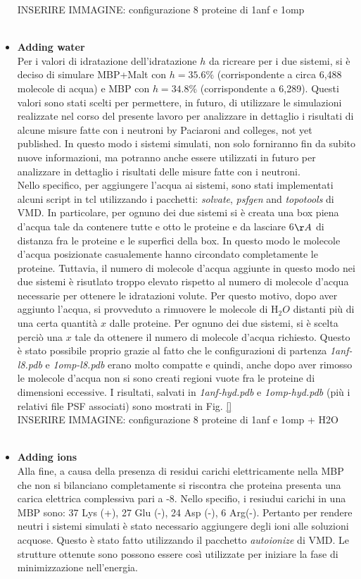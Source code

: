 \begin{itemize}
INSERIRE IMMAGINE: configurazione 8 proteine di 1anf e 1omp\\
\\
\item \textbf{Adding water}\\
Per i valori di idratazione dell'idratazione $h$ da ricreare per i due sistemi, si è deciso di simulare MBP+Malt con $h = 35.6\%$ (corrispondente a circa 6,488 molecole di acqua) e MBP con $h = 34.8\%$ (corrispondente a  6,289). Questi valori sono stati scelti per permettere, in futuro, di utilizzare le simulazioni realizzate nel corso del presente lavoro per analizzare in dettaglio i risultati di alcune misure fatte con i neutroni by Paciaroni and colleges, not yet published. In questo modo i sistemi simulati, non solo forniranno fin da subito nuove informazioni, ma potranno anche essere utilizzati in futuro per analizzare in dettaglio i risultati delle misure fatte con i neutroni.\\
Nello specifico, per aggiungere l'acqua ai sistemi, sono stati implementati alcuni script in tcl utilizzando i pacchetti: \textit{solvate}, \textit{psfgen} and \textit{topotools} di VMD. In particolare, per ognuno dei due sistemi si è creata una box piena d'acqua tale da contenere tutte e otto le proteine e da lasciare 6$\AA$ di distanza fra le proteine e le superfici della box. In questo modo le molecole d'acqua posizionate casualemente hanno circondato completamente le proteine. Tuttavia, il numero di molecole d'acqua aggiunte in questo modo nei due sistemi è risutlato troppo elevato rispetto al numero di molecole d'acqua necessarie per ottenere le idratazioni volute. Per questo motivo, dopo aver aggiunto l'acqua, si provveduto a rimuovere le molecole di H$_2O$ distanti più di una certa quantità $x$ dalle proteine. Per ognuno dei due sistemi, si è scelta perciò una $x$ tale da ottenere il numero di molecole d'acqua richiesto. Questo è stato possibile proprio grazie al fatto che le configurazioni di partenza \textit{1anf-l8.pdb} e \textit{1omp-l8.pdb} erano molto compatte e quindi, anche dopo aver rimosso le molecole d'acqua non si sono creati regioni vuote fra le proteine di dimensioni eccessive. I risultati, salvati in \textit{1anf-hyd.pdb} e \textit{1omp-hyd.pdb} (più i relativi file PSF associati) sono mostrati in Fig. \ref{}
\\
INSERIRE IMMAGINE: configurazione 8 proteine di 1anf e 1omp + H2O\\
\\
\item \textbf{Adding ions}\\
Alla fine, a causa della presenza di residui carichi elettricamente nella MBP che non si bilanciano completamente si riscontra che proteina presenta una carica elettrica complessiva pari a -8. Nello specifio, i resiudui carichi in una MBP sono: 37 Lys (+), 27 Glu (-), 24 Asp (-), 6 Arg(-). Pertanto per rendere neutri i sistemi simulati è stato necessario aggiungere degli ioni alle soluzioni acquose. Questo è stato fatto utilizzando il pacchetto \textit{autoionize} di VMD. Le strutture ottenute sono possono essere così utilizzate per iniziare la fase di minimizzazione nell'energia.


\end{itemize}
